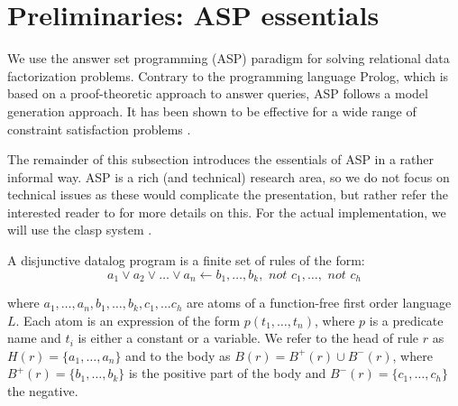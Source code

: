 \section{Preliminaries: ASP essentials}\label{section:asp}

We use the answer set programming (ASP) paradigm for solving relational data factorization problems. Contrary to the programming language Prolog, which is based on a proof-theoretic approach to answer queries, ASP follows a model generation approach. It has been shown to be effective for a wide range of constraint satisfaction problems \parencite{aspbook}.

The remainder of this subsection introduces the essentials of ASP in a rather informal way. ASP is a rich (and technical) research area, so we do not focus on technical issues as these would complicate the presentation, but rather refer the interested reader to \cite{aspbook,eiter,leone,DBLP:conf/aaai/Lifschitz08} for more details on this. For the actual implementation, we will use the clasp system \parencite{aspbook,BrewkaCACM}.


\begin{definition}
  A disjunctive datalog program is a finite set of rules of the form: 
  \begin{equation*}
    a_1 \vee a_2 \vee \dots \vee a_n \leftarrow b_1, \dots, b_k, \textit{ not }c_1,\dots,\textit{ not }c_h 
  \end{equation*}
\end{definition}
where $a_1, \dots, a_n, b_1, \dots, b_k,c_1, \dots c_h$ are atoms of a function-free first order language $L$. Each atom is an expression of the form $p(t_1,\ldots,t_n)$, where $p$ is a predicate name and $t_i$ is either a constant or a variable. We refer to the head of rule $r$ as $H(r) = \{a_1,\dots,a_n\}$ and to the body as $B(r) = B^{+}(r) \cup B^{-}(r)$, where $B^{+}(r) = \{ b_1, \dots, b_k \}$ is the positive part of the body and $B^{-}(r) = \{ c_1, \dots, c_h \}$ the negative. 

